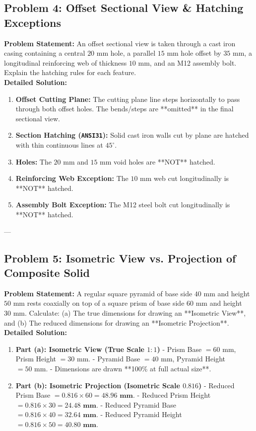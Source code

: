 \subsection{Problem 4: Offset Sectional View \& Hatching Exceptions}
\textbf{Problem Statement:} An offset sectional view is taken through a cast iron casing containing a central $20\text{ mm}$ hole, a parallel $15\text{ mm}$ hole offset by $35\text{ mm}$, a longitudinal reinforcing web of thickness $10\text{ mm}$, and an M12 assembly bolt. Explain the hatching rules for each feature.\\[4pt]
\textbf{Detailed Solution:}
\begin{enumerate}
    \item \textbf{Offset Cutting Plane:} The cutting plane line steps horizontally to pass through both offset holes. The bends/steps are **omitted** in the final sectional view.
    \item \textbf{Section Hatching (\texttt{ANSI31}):} Solid cast iron walls cut by plane are hatched with thin continuous lines at $45^\circ$.
    \item \textbf{Holes:} The $20\text{ mm}$ and $15\text{ mm}$ void holes are **NOT** hatched.
    \item \textbf{Reinforcing Web Exception:} The $10\text{ mm}$ web cut longitudinally is **NOT** hatched.
    \item \textbf{Assembly Bolt Exception:} The M12 steel bolt cut longitudinally is **NOT** hatched.
\end{enumerate}

---

\subsection{Problem 5: Isometric View vs. Projection of Composite Solid}
\textbf{Problem Statement:} A regular square pyramid of base side $40\text{ mm}$ and height $50\text{ mm}$ rests coaxially on top of a square prism of base side $60\text{ mm}$ and height $30\text{ mm}$. Calculate: (a) The true dimensions for drawing an **Isometric View**, and (b) The reduced dimensions for drawing an **Isometric Projection**.\\[4pt]
\textbf{Detailed Solution:}
\begin{enumerate}
    \item \textbf{Part (a): Isometric View (True Scale $1:1$)}
    - Prism Base $= 60\text{ mm}$, Prism Height $= 30\text{ mm}$.
    - Pyramid Base $= 40\text{ mm}$, Pyramid Height $= 50\text{ mm}$.
    - Dimensions are drawn **100\% at full actual size**.
    \item \textbf{Part (b): Isometric Projection (Isometric Scale $0.816$)}
    - Reduced Prism Base $= 0.816 \times 60 = \mathbf{48.96\text{ mm}}$.
    - Reduced Prism Height $= 0.816 \times 30 = \mathbf{24.48\text{ mm}}$.
    - Reduced Pyramid Base $= 0.816 \times 40 = \mathbf{32.64\text{ mm}}$.
    - Reduced Pyramid Height $= 0.816 \times 50 = \mathbf{40.80\text{ mm}}$.
\end{enumerate}

